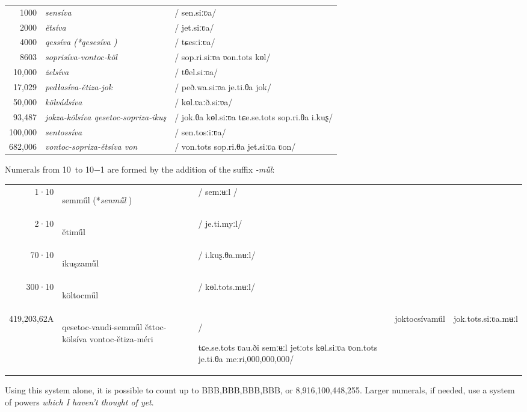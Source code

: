 \documentclass[grammar]{subfiles}
\begin{document}
	\begin{exe}
		\ex
		\begin{tabular}[t]{r >{\itshape}l >{/}l<{/}}
			1000\duo    & sensíva & sen.siːʋa\\
			2000\duo    & ětsíva & jet.siːʋa\\
			4000\duo    & qessíva \textup{(*\emph{qesesíva} )} & tɕesːiːʋa\\
			8603\duo    & soprisíva-vontoc-köl & sop.ri.siːʋa ʋon.tots kɵl\\
			10,000\duo  & żelsíva & tθel.siːʋa\\
			17,029\duo  & pedłasíva-ětiza-jok & peð.wa.siːʋa je.ti.θa jok\\
			50,000\duo  & kölvádsíva & kɵl.ʋaːð.siːʋa\\
			93,487\duo  & jokza-kölsíva qesetoc-sopriza-ikuş & jok.θa kɵl.siːʋa tɕe.se.tots sop.ri.θa i.kuʂ\\
			100,000\duo & sentossíva & sen.tosːiːʋa\\
			682,006\duo & vontoc-sopriza-ětsíva von & von.tots sop.ri.θa jet.siːʋa ʋon\\
		\end{tabular}
	\end{exe}

	\newpage
	Numerals from 10\duo\ to 10\duo−1 are formed by the addition of the suffix \emph{-műl}:

	\begin{exe}
		\ex
		\begin{tabular}[t]{r >{\itshape\raggedright}m{5cm} >{/}m{4cm}<{/}}
			1·10\duo       & semműl \textup{(*\emph{senműl} )} & semːʉːl \\
			2·10\duo       & ětiműl & je.ti.myːl\\
			70·10\duo      & ikuşzaműl & i.kuʂ.θa.mʉːl\\
			300·10\duo     & költocműl & kɵl.tots.mʉːl\\
			419,203,62A\duo     & qesetoc-vaudi-semműl ěttoc-kölsíva vontoc-ětiza-méri & \raggedright tɕe.se.tots ʋau.ði semːʉːl jetːots kɵl.siːʋa ʋon.tots je.ti.θa meːri,000,000,000\duo & joktocsívaműl & jok.tots.siːʋa.mʉːl\\
		\end{tabular}
	\end{exe}

	Using this system alone, it is possible to count up to BBB,BBB,BBB,BBB\duo, or 8,916,100,448,255\dec. Larger numerals, if needed, use a system of powers \emph{which I haven't thought of yet}.
\end{document}
